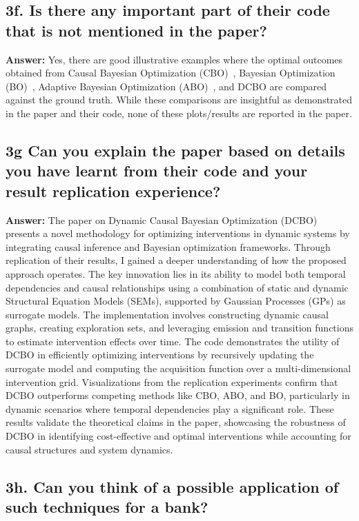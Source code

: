\documentclass[a4paper,10pt]{article}
\begin{document}
\subsection*{3f. Is there any important part of their code that is not mentioned in the paper?}

\textbf{Answer:} Yes, there are good illustrative examples where the optimal outcomes obtained from Causal Bayesian Optimization (CBO)~\cite{aglietti2020causal}, Bayesian Optimization (BO)~\cite{nyikosa2018bayesian}, Adaptive Bayesian Optimization (ABO)~\cite{nyikosa2018bayesian}, and DCBO are compared against the ground truth. While these comparisons are insightful as demonstrated in the paper and their code, none of these plots/results are reported in the paper.


\subsection*{3g Can you explain the paper based on details you have learnt from their code and your result replication experience?}

\textbf{Answer:} The paper on Dynamic Causal Bayesian Optimization (DCBO)~\cite{aglietti2021dynamic} presents a novel methodology for optimizing interventions in dynamic systems by integrating causal inference and Bayesian optimization frameworks. Through replication of their results, I gained a deeper understanding of how the proposed approach operates. The key innovation lies in its ability to model both temporal dependencies and causal relationships using a combination of static and dynamic Structural Equation Models (SEMs), supported by Gaussian Processes (GPs) as surrogate models. The implementation involves constructing dynamic causal graphs, creating exploration sets, and leveraging emission and transition functions to estimate intervention effects over time. The code demonstrates the utility of DCBO in efficiently optimizing interventions by recursively updating the surrogate model and computing the acquisition function over a multi-dimensional intervention grid. Visualizations from the replication experiments confirm that DCBO outperforms competing methods like CBO, ABO, and BO, particularly in dynamic scenarios where temporal dependencies play a significant role. These results validate the theoretical claims in the paper, showcasing the robustness of DCBO in identifying cost-effective and optimal interventions while accounting for causal structures and system dynamics.

\subsection*{3h. Can you think of a possible application of such techniques for a bank?}
\end{document}
